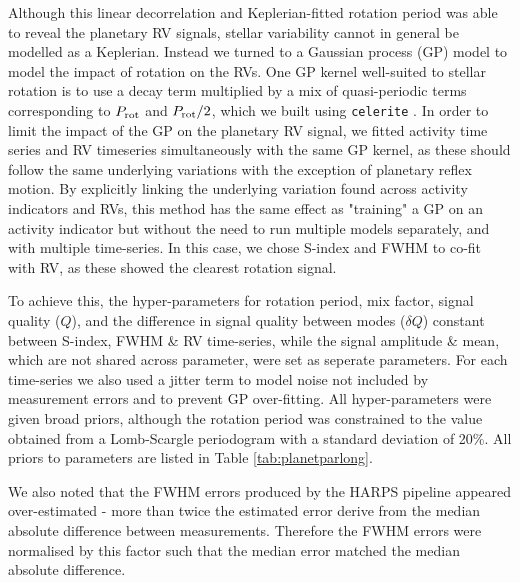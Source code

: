 \documentclass[fleqn,usenatbib]{mnras}
\newcommand{\harps}{{HARPS}}
\begin{document}
Although this linear decorrelation and Keplerian-fitted rotation period was able to reveal the planetary RV signals, stellar variability cannot in general be modelled as a Keplerian.
Instead we turned to a Gaussian process (GP) model to model the impact of rotation on the RVs.
One GP kernel well-suited to stellar rotation is to use a decay term multiplied by a mix of quasi-periodic terms corresponding to $P_{\rm rot}$ and $P_{\rm rot}/2$, which we built using \texttt{celerite} \citep{foreman2017fast}.
In order to limit the impact of the GP on the planetary RV signal, we fitted activity time series and RV timeseries simultaneously with the same GP kernel, as these should follow the same underlying variations with the exception of planetary reflex motion.
By explicitly linking the underlying variation found across activity indicators and RVs, this method has the same effect as "training" a GP on an activity indicator but without the need to run multiple models separately, and with multiple time-series.
In this case, we chose S-index and FWHM to co-fit with RV, as these showed the clearest rotation signal.

To achieve this, the hyper-parameters for rotation period, mix factor, signal quality ($Q$), and the difference in signal quality between modes ($\delta Q$) constant between S-index, FWHM \& RV time-series, while the signal amplitude \& mean, which are not shared across parameter, were set as seperate parameters.
For each time-series we also used a jitter term to model noise not included by measurement errors and to prevent GP over-fitting.
All hyper-parameters were given broad priors, although the rotation period was constrained to the value obtained from a Lomb-Scargle periodogram with a standard deviation of 20\%.
All priors to parameters are listed in Table \ref{tab:planetparlong}.

We also noted that the FWHM errors produced by the \harps{} pipeline appeared over-estimated - more than twice the estimated error derive from the median absolute difference between measurements.
Therefore the FWHM errors were normalised by this factor such that the median error matched the median absolute difference.
\end{document}

